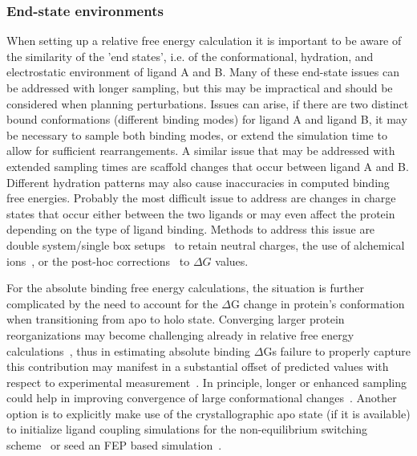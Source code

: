 \documentclass[9pt,bestpractices,pubversion]{livecoms}
\begin{document}
\subsubsection{End-state environments}
When setting up a relative free energy calculation it is important to be aware of the similarity of the 'end states', i.e. of the conformational, hydration, and electrostatic environment of ligand A and B. Many of these end-state issues can be addressed with longer sampling, but this may be impractical and should be considered when planning perturbations. Issues can arise, if there are two distinct bound conformations (different binding modes) for ligand A and ligand B, it may be necessary to sample both binding modes, or extend the simulation time to allow for sufficient rearrangements. A similar issue that may be addressed with extended sampling times are scaffold changes that occur between ligand A and B. Different hydration patterns may also cause inaccuracies in computed binding free energies. Probably the most difficult issue to address are changes in charge states that occur either between the two ligands or may even affect the protein depending on the type of ligand binding. Methods to address this issue are double system/single box setups~\cite{gapsys2015dssb} to retain neutral charges, the use of alchemical ions~\cite{chen2018chargecorrections}, or the post-hoc corrections~\cite{rocklin2013chargecorrection,reif2014chargecorrections} to $\Delta G$ values.

For the absolute binding free energy calculations, the situation is further complicated by the need to account for the $\Delta$G change in protein's conformation when transitioning from apo to holo state. Converging larger protein reorganizations may become challenging already in relative free energy calculations~\cite{lim2016sensitivity}, thus in estimating absolute binding $\Delta$Gs failure to properly capture this contribution may manifest in a substantial offset of predicted values with respect to experimental measurement~\cite{khalak2021absolutedg}. In principle, longer or enhanced sampling could help in improving convergence of large conformational changes~\cite{meyBestPracticesAlchemical2020}. Another option is to explicitly make use of the crystallographic apo state (if it is available) to initialize ligand coupling simulations for the non-equilibrium switching scheme~\cite{gapsys2021absdg} or seed an FEP based simulation~\cite{hahn2020FEPseeding}.
\end{document}
